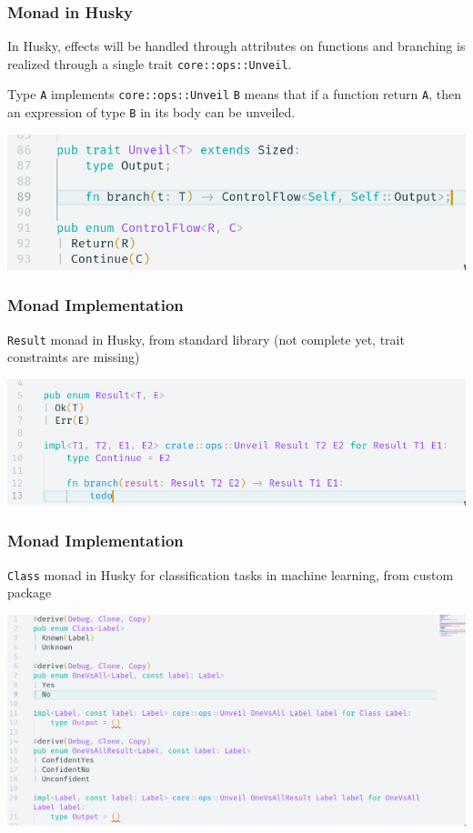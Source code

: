 \documentclass{beamer}   	%
\theoremstyle{definition}
\newcommand{\rust}[1]{\texttt{#1}}
\begin{document}
\begin{frame}
\frametitle{Monad in Husky}
 In Husky, effects will be handled through attributes on functions and branching is realized through a single trait \texttt{core::ops::Unveil}.

Type \rust{A} implements \texttt{core::ops::Unveil} \rust{B} means that if a function return \rust{A}, then an expression of type \rust{B} in its body can be unveiled.

 \includegraphics[width=\linewidth]{snapshots/husky_core_ops_unveil.png}
\end{frame}

\begin{frame}
\frametitle{Monad Implementation}
\texttt{Result} monad in Husky, from standard library (not complete yet, trait constraints are missing)

 \includegraphics[width=\linewidth]{snapshots/husky_impl_unveil_for_result.png}
\end{frame}

\begin{frame}
\frametitle{Monad Implementation}
\texttt{Class} monad in Husky for classification tasks in machine learning, from custom package

 \includegraphics[width=\linewidth]{snapshots/husky_class.png}
\end{frame}
\end{document}
